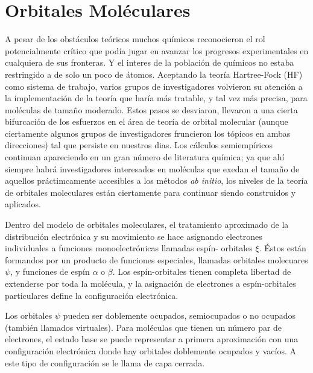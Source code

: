 \section*{Orbitales Mol\'eculares}
A pesar de los obst\'aculos te\'oricos muchos qu\'imicos reconocieron
el rol potencialmente cr\'itico que pod\'ia jugar en avanzar los 
progresos experimentales en cualquiera de sus fronteras. Y el interes 
de la poblaci\'on de qu\'imicos no estaba restringido a de solo un 
poco de \'atomos. Aceptando la teor\'ia Hartree-Fock (HF) como sistema
de trabajo, varios grupos de investigadores volvieron su atenci\'on a
la implementaci\'on de la teor\'ia que har\'ia m\'as tratable, y tal 
vez m\'as precisa, para mol\'eculas de tama\~no moderado. Estos pasos
se desviaron, llevaron a una cierta bifurcaci\'on de los esfuerzos en
el \'area de teor\'ia de orbital molecular (aunque ciertamente algunos
grupos de investigadores fruncieron los t\'opicos en ambas 
direcciones) tal que persiste en nuestros dias. Los c\'alculos 
semiemp\'iricos continuan apareciendo en un gran n\'umero de 
literatura qu\'imica; ya que ah\'i siempre habr\'a investigadores 
interesados en mol\'eculas que exedan el tama\~no de aquellos 
pr\'actimcamente accesibles a los m\'etodos {\it ab initio}, los 
niveles de la teor\'ia de orbitales moleculares est\'an ciertamente
para continuar siendo construidos y aplicados. 
 
Dentro  del modelo de orbitales moleculares, el tratamiento aproximado
de la distribuci\'on electr\'onica y su movimiento se hace asignando 
electrones individuales a funciones monoelectr\'onicas llamadas esp\'in-
orbitales $\xi$. \'Estos est\'an formandos por un producto de funciones
especiales, llamadas orbitales molecuares $\psi$, y funciones de 
esp\'in  $\alpha$ o $\beta$. Los esp\'in-orbitales tienen completa 
libertad de extenderse por toda la mol\'ecula, y la asignaci\'on de
electrones a esp\'in-orbitales particulares define la configuraci\'on
electr\'onica.

Los orbitales $\psi$ pueden ser doblemente ocupados, semiocupados o no
ocupados (tambi\'en llamados virtuales). Para mol\'eculas que tienen 
un n\'umero par de electrones, el estado base se puede representar a
primera aproximaci\'on con una configuraci\'on electr\'onica donde hay
orbitales doblemente ocupados y vac\'ios. A este tipo de 
configuraci\'on se le llama de capa cerrada.

